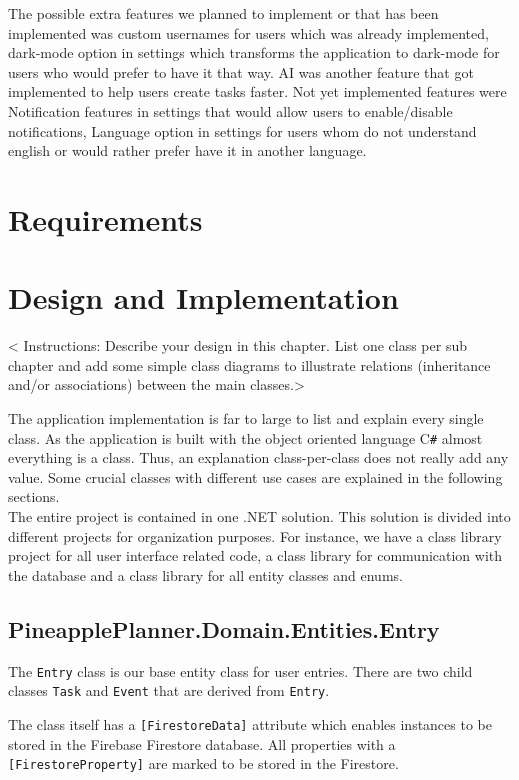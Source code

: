 \documentclass{article}
\begin{document}
The possible extra features we planned to implement or that has been implemented was custom usernames for users which was already implemented, dark-mode option in settings which transforms the application to dark-mode for users who would prefer to have it that way. AI was another feature that got implemented to help users create tasks faster. Not yet implemented features were Notification features in settings that would allow users to enable/disable notifications, Language option in settings for users whom do not understand english or would rather prefer have it in another language.

\section{Requirements}
\section{Design and Implementation}
< Instructions: Describe your design in this chapter.
List one class per sub chapter and add some simple class diagrams to illustrate relations (inheritance and/or associations) between the main classes.>

The application implementation is far to large to list and explain every single class.
As the application is built with the object oriented language C\verb|#| almost everything is a class.
Thus, an explanation class-per-class does not really add any value.
Some crucial classes with different use cases are explained in the following sections.
\\
The entire project is contained in one .NET solution.
This solution is divided into different projects for organization purposes.
For instance, we have a class library project for all user interface related code, a class library for communication with the database and a class library for all entity classes and enums.

\subsection{PineapplePlanner.Domain.Entities.Entry}

The \verb|Entry| class is our base entity class for user entries.
There are two child classes \verb|Task| and \verb|Event| that are derived from \verb|Entry|.

The class itself has a \verb|[FirestoreData]| attribute which enables instances to be stored in the Firebase Firestore database.
All properties with a \verb|[FirestoreProperty]| are marked to be stored in the Firestore.
\end{document}
